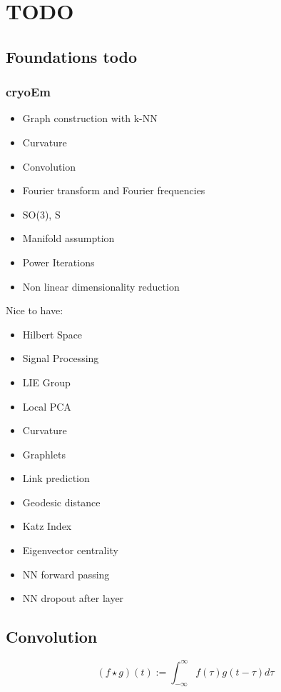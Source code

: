 \chapter{TODO}
\section{Foundations todo}

\subsection{cryoEm}


\begin{itemize}
    \item Graph construction with k-NN
    \item Curvature
    \item Convolution
    \item Fourier transform and Fourier frequencies
    \item SO(3), S
    \item Manifold assumption
    \item Power Iterations
    \item Non linear dimensionality reduction
\end{itemize}

Nice to have:
\begin{itemize}
    \item Hilbert Space
    \item Signal Processing    
    \item LIE Group
    \item Local PCA
    \item Curvature
    \item Graphlets
    \item Link prediction
    \item Geodesic distance
    \item Katz Index
    \item Eigenvector centrality
    \item NN forward passing
    \item NN dropout after layer
\end{itemize}

\section{Convolution}
\begin{equation}
    (f \star g)(t) := \int_{-\infty}^{\infty} f(\tau) g(t - \tau) d\tau
\end{equation}

